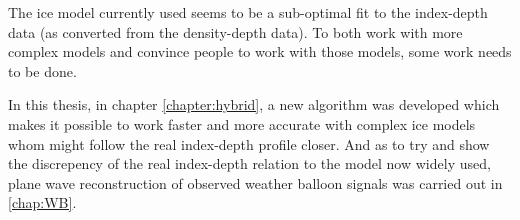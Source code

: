 The ice model currently used seems to be a sub-optimal fit to the index-depth
data (as converted from the density-depth data).  To both work with more
complex models and convince people to work with those models, some work needs
to be done.  

In this thesis, in chapter \ref{chapter:hybrid}, a new algorithm was developed
which makes it possible to work faster and more accurate with complex ice
models whom might follow the real index-depth profile closer. And as to try and
show the discrepency of the real index-depth relation to the model now widely
used, plane wave reconstruction of observed weather balloon signals was carried
out in \ref{chap:WB}.
